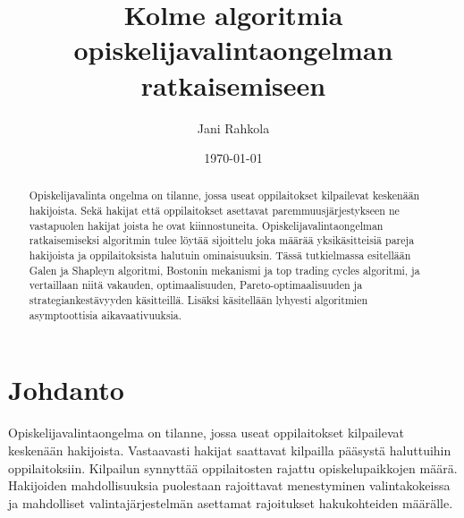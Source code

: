 \documentclass[twoside]{tktltiki}
\begin{document}
\title{Kolme algoritmia opiskelijavalintaongelman ratkaisemiseen}
\author{Jani Rahkola}
\date{\today}



\maketitle

\doublespacing

\subject{Tietojenkäsittelytiede}

\def\hyph{-\penalty0\hskip0pt\relax}
\hyphenation{}

\begin{abstract}
Opiskelijavalinta ongelma on tilanne, jossa useat oppilaitokset
kilpailevat keskenään hakijoista. Sekä hakijat että oppilaitokset
asettavat paremmuusjärjestykseen ne vastapuolen hakijat joista he ovat
kiinnostuneita. Opiskelijavalintaongelman ratkaisemiseksi algoritmin
tulee löytää sijoittelu joka määrää yksikäsitteisiä pareja hakijoista
ja oppilaitoksista halutuin ominaisuuksin. Tässä tutkielmassa
esitellään Galen ja Shapleyn algoritmi, Bostonin mekanismi ja top
trading cycles algoritmi, ja vertaillaan niitä vakauden,
optimaalisuuden, Pareto\hyph optimaalisuuden ja strategiankestävyyden
käsitteillä. Lisäksi käsitellään lyhyesti algoritmien asymptoottisia
aikavaativuuksia.
\end{abstract}

\mytableofcontents

\section{Johdanto}

Opiskelijavalintaongelma on tilanne, jossa useat oppilaitokset
kilpailevat keskenään hakijoista. Vastaavasti hakijat saattavat
kilpailla pääsystä haluttuihin oppilaitoksiin. Kilpailun synnyttää
oppilaitosten rajattu opiskelupaikkojen määrä. Hakijoiden
mahdollisuuksia puolestaan rajoittavat menestyminen valintakokeissa ja
mahdolliset valintajärjestelmän asettamat rajoitukset hakukohteiden
määrälle.
\end{document}
